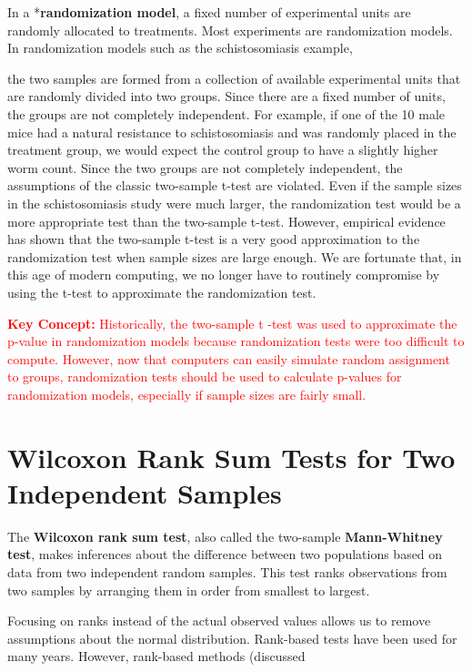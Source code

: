 \documentclass[
]{report}
\begin{document}
In a *\textbf{randomization model}, a fixed number of experimental units are randomly allocated to treatments. Most experiments are randomization models. In randomization models such as the schistosomiasis example,

the two samples are formed from a collection of available experimental units that are randomly divided into two groups. Since there are a fixed number of units, the groups are not completely independent. For example,
if one of the 10 male mice had a natural resistance to schistosomiasis and was randomly placed in the treatment group, we would expect the control group to have a slightly higher worm count. Since the two groups are not completely independent, the assumptions of the classic two-sample t-test are violated. Even if the sample sizes in the schistosomiasis study were much larger, the randomization test would be a more appropriate test than the two-sample t-test. However, empirical evidence has shown that the two-sample t-test is a very good approximation to the randomization test when sample sizes are large enough. We are fortunate that, in this age of modern computing, we no longer have to routinely compromise by using the t-test to approximate the randomization test.

\Large

\textbf{\textcolor{red}{Key Concept:}}
\textcolor{red}{Historically, the two-sample t -test was used to approximate the p-value in randomization models because randomization tests were too difficult to compute. However, now that computers can easily simulate random assignment to groups, randomization tests should be used to calculate p-values for randomization models, especially if sample sizes are fairly small.}

\normalsize

\section{\texorpdfstring{\textbf{Wilcoxon Rank Sum Tests for Two Independent Samples}}{Wilcoxon Rank Sum Tests for Two Independent Samples}}\label{wilcoxon-rank-sum-tests-for-two-independent-samples}

The \textbf{Wilcoxon rank sum test}, also called the two-sample \textbf{Mann-Whitney test}, makes inferences about the difference between two populations based on data from two independent random samples. This test ranks observations from two samples by arranging them in order from smallest to largest.

Focusing on ranks instead of the actual observed values allows us to remove assumptions about the normal distribution. Rank-based tests have been used for many years. However, rank-based methods (discussed
\end{document}
